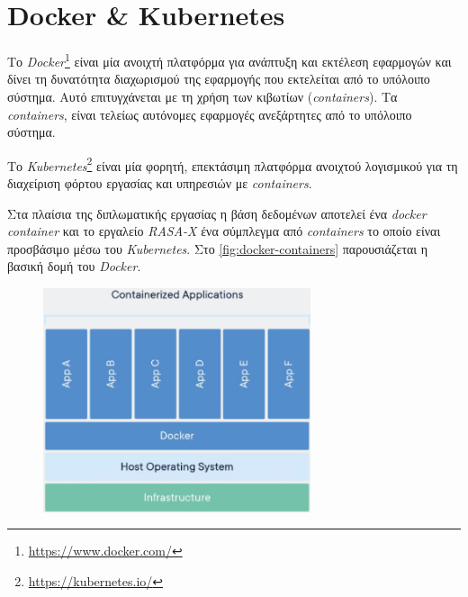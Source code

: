 \section{Docker \& Kubernetes}
\label{sec:docker-kubernetes}
Το \emph{Docker}\footnote{\url{https://www.docker.com/}} είναι μία ανοιχτή πλατφόρμα για ανάπτυξη και εκτέλεση εφαρμογών και δίνει τη δυνατότητα διαχωρισμού της εφαρμογής που εκτελείται από το υπόλοιπο σύστημα. Αυτό επιτυγχάνεται με τη χρήση των κιβωτίων (\emph{containers}). Τα \emph{containers}, είναι τελείως αυτόνομες εφαρμογές ανεξάρτητες από το υπόλοιπο σύστημα.

Το \emph{Kubernetes}\footnote{\url{https://kubernetes.io/}} είναι μία φορητή, επεκτάσιμη πλατφόρμα ανοιχτού λογισμικού για τη διαχείριση φόρτου εργασίας και υπηρεσιών με \emph{containers}.

Στα πλαίσια της διπλωματικής εργασίας η βάση δεδομένων αποτελεί ένα \emph{docker container} και το εργαλείο \emph{RASA-X} ένα σύμπλεγμα από \emph{containers} το οποίο είναι προσβάσιμο μέσω του \emph{Kubernetes}. Στο \autoref{fig:docker-containers} παρουσιάζεται η βασική δομή του \emph{Docker}.

\begin{figure}[!ht]
  \centering
  \includegraphics[width=0.7\textwidth]{images/chapter3/docker-containerized-applictions.png}
  \captionsetup{justification=centering}
  \label{fig:docker-containers}
\end{figure}
\noindent